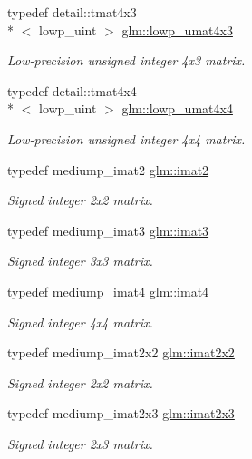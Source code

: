 \begin{DoxyCompactItemize}
typedef detail\-::tmat4x3\\*
$<$ lowp\-\_\-uint $>$ \hyperlink{group__gtc__matrix__integer_ga37c5f105dd98823c07c39710f57260fe}{glm\-::lowp\-\_\-umat4x3}
\begin{DoxyCompactList}\small\item\em Low-\/precision unsigned integer 4x3 matrix. \end{DoxyCompactList}\item 
typedef detail\-::tmat4x4\\*
$<$ lowp\-\_\-uint $>$ \hyperlink{group__gtc__matrix__integer_ga38b31bccefd74f6a9e9272cac084df34}{glm\-::lowp\-\_\-umat4x4}
\begin{DoxyCompactList}\small\item\em Low-\/precision unsigned integer 4x4 matrix. \end{DoxyCompactList}\item 
typedef mediump\-\_\-imat2 \hyperlink{group__gtc__matrix__integer_ga77a581b3366fb63fc72f8f20830003e0}{glm\-::imat2}
\begin{DoxyCompactList}\small\item\em Signed integer 2x2 matrix. \end{DoxyCompactList}\item 
typedef mediump\-\_\-imat3 \hyperlink{group__gtc__matrix__integer_ga45481922dd07a3a8e23758286311ee97}{glm\-::imat3}
\begin{DoxyCompactList}\small\item\em Signed integer 3x3 matrix. \end{DoxyCompactList}\item 
typedef mediump\-\_\-imat4 \hyperlink{group__gtc__matrix__integer_ga40fc5c5e0b07543497aa1c314891544a}{glm\-::imat4}
\begin{DoxyCompactList}\small\item\em Signed integer 4x4 matrix. \end{DoxyCompactList}\item 
typedef mediump\-\_\-imat2x2 \hyperlink{group__gtc__matrix__integer_gaf7f44f44d966377666d41ed059524732}{glm\-::imat2x2}
\begin{DoxyCompactList}\small\item\em Signed integer 2x2 matrix. \end{DoxyCompactList}\item 
typedef mediump\-\_\-imat2x3 \hyperlink{group__gtc__matrix__integer_ga143bc5177bac9991d84b70da03952516}{glm\-::imat2x3}
\begin{DoxyCompactList}\small\item\em Signed integer 2x3 matrix. \end{DoxyCompactList}\item 

\end{DoxyCompactItemize}
